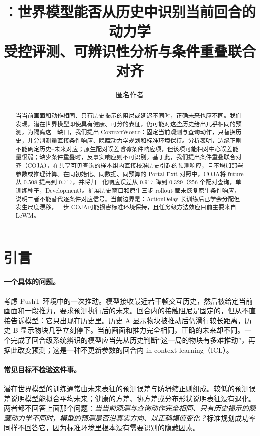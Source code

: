 \documentclass[UTF8,zihao=-4,fontset=fandol]{ctexart}
\title{\bfseries\fontsize{18pt}{23pt}\selectfont
\benchmark：世界模型能否从历史中识别当前回合的动力学\\[0.35em]
\large 受控评测、可辨识性分析与条件重叠联合对齐}
\author{匿名作者}
\date{}
\newcommand{\method}{\textsc{COJA}}
\newcommand{\benchmark}{\textsc{ContextWorld}}
\begin{document}
\maketitle

\begin{abstract}
当当前画面和动作相同、只有历史揭示的阻尼或延迟不同时，正确未来也应不同。我们发现，潜在世界模型即使具有健康、可分的表征，仍可能对这些历史给出几乎相同的预测。为隔离这一缺口，我们提出 \benchmark：固定当前观测与查询动作，只替换历史，并分别测量直接条件响应、隐藏动力学规划和标准环境保持。分析表明，边缘正则不能确定历史--未来对应；原生配对误差\emph{含有}条件响应项，但该项可能相对中心误差能量很弱；缺少条件重叠时，反事实响应则不可识别。基于此，我们提出条件重叠联合对齐（\method），在共享可见查询的样本组内直接校准历史引起的预测响应，且不增加部署参数或推理计算。在同初始化、同数据、同预算的 Portal Exit 对照中，\method 将 future 从 $0.508$ 提高到 $0.717$，并将归一化响应误差从 $0.917$ 降到 $0.329$（$256$ 个配对查询，单训练种子，Development）。扩展历史窗口和原生三步 rollout 都未恢复原生条件响应，说明二者不能替代逐条件对应信号。当前边界是：ActionDelay 长训练后已学会分配但发生尺度漂移，一步 \method 可能损害标准环境保持，且任务级方法效应目前主要来自 LeWM。
\end{abstract}

\section{引言}

\paragraph{一个具体的问题。}
考虑 PushT 环境中的一次推动。模型接收最近若干帧交互历史，然后被给定当前画面和一段推力，要求预测执行后的未来。回合内的接触阻尼是固定的，但从不直接告诉模型：它只出现在历史里。历史 A 显示物块被推动后仍滑行较长距离，历史 B 显示物块几乎立刻停下。当前画面和推力完全相同，正确的未来却不同。一个完成了回合级系统辨识的模型应当先从历史判断“这一局的物块有多难推动”，再据此改变预测；这是一种不更新参数的回合内 in-context learning（ICL）。

\paragraph{常见目标不检验这件事。}
潜在世界模型的训练通常由未来表征的预测误差与防坍缩正则组成。较低的预测误差说明模型能拟合平均未来；健康的方差、协方差或分布形状说明表征没有退化。两者都不回答上面那个问题：\emph{当当前观测与查询动作完全相同、只有历史揭示的隐藏动力学不同时，模型的预测是否沿真实方向、以正确幅值变化？}标准规划成功率同样不回答它，因为标准环境里根本没有需要识别的隐藏因素。
\end{document}
